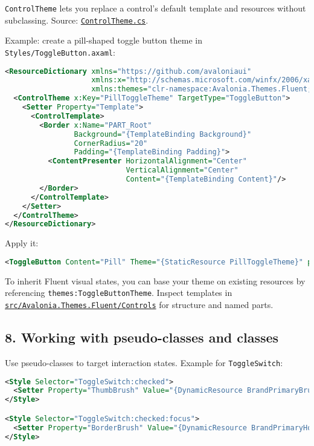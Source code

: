 \passthrough{\lstinline!ControlTheme!} lets you replace a control's
default template and resources without subclassing. Source:
\href{https://github.com/AvaloniaUI/Avalonia/blob/master/src/Avalonia.Base/Styling/ControlTheme.cs}{\passthrough{\lstinline!ControlTheme.cs!}}.

Example: create a pill-shaped toggle button theme in
\passthrough{\lstinline!Styles/ToggleButton.axaml!}:

\begin{lstlisting}[language=XML]
<ResourceDictionary xmlns="https://github.com/avaloniaui"
                    xmlns:x="http://schemas.microsoft.com/winfx/2006/xaml"
                    xmlns:themes="clr-namespace:Avalonia.Themes.Fluent;assembly=Avalonia.Themes.Fluent">
  <ControlTheme x:Key="PillToggleTheme" TargetType="ToggleButton">
    <Setter Property="Template">
      <ControlTemplate>
        <Border x:Name="PART_Root"
                Background="{TemplateBinding Background}"
                CornerRadius="20"
                Padding="{TemplateBinding Padding}">
          <ContentPresenter HorizontalAlignment="Center"
                            VerticalAlignment="Center"
                            Content="{TemplateBinding Content}"/>
        </Border>
      </ControlTemplate>
    </Setter>
  </ControlTheme>
</ResourceDictionary>
\end{lstlisting}

Apply it:

\begin{lstlisting}[language=XML]
<ToggleButton Content="Pill" Theme="{StaticResource PillToggleTheme}" padding="12,6"/>
\end{lstlisting}

To inherit Fluent visual states, you can base your theme on existing
resources by referencing
\passthrough{\lstinline!themes:ToggleButtonTheme!}. Inspect templates in
\href{https://github.com/AvaloniaUI/Avalonia/tree/master/src/Avalonia.Themes.Fluent/Controls}{\passthrough{\lstinline!src/Avalonia.Themes.Fluent/Controls!}}
for structure and named parts.

\subsection{8. Working with pseudo-classes and
classes}\label{working-with-pseudo-classes-and-classes}

Use pseudo-classes to target interaction states. Example for
\passthrough{\lstinline!ToggleSwitch!}:

\begin{lstlisting}[language=XML]
<Style Selector="ToggleSwitch:checked">
  <Setter Property="ThumbBrush" Value="{DynamicResource BrandPrimaryBrush}"/>
</Style>

<Style Selector="ToggleSwitch:checked:focus">
  <Setter Property="BorderBrush" Value="{DynamicResource BrandPrimaryHoverBrush}"/>
</Style>
\end{lstlisting}

